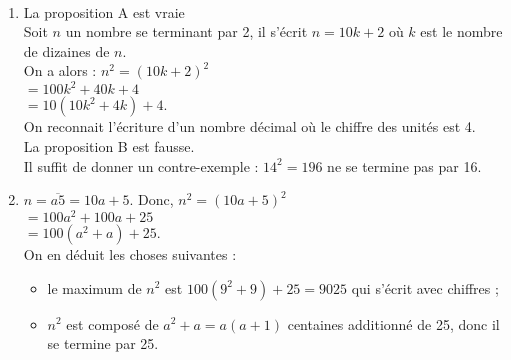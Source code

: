 \ \\ [-5mm]
   \begin{enumerate}
      \item
      {\blue La proposition A est vraie} \\
         Soit $n$ un nombre se terminant par 2, il s'écrit $n=10k+2$ où $k$ est le nombre de dizaines de $n$. \\
         On a alors : $n^2 =(10k+2)^2$ \\
         \hspace*{2.1cm} $=100k^2+40k+4$ \\
         \hspace*{2.1cm} $=10(10k^2+4k)+4$. \\
         On reconnait l'écriture d'un nombre décimal où le chiffre des unités est 4. \\
      {\blue La proposition B est fausse.} \\
       Il suffit de donner un contre-exemple : $14^2=196$ ne se termine pas par 16. \\
      \item $n =\overline{a5} =10a+5$. Donc, $n^2=(10a+5)^2$ \\
      \hspace*{4.35cm} $=100a^2+100a+25$ \\
      \hspace*{4.35cm} $ =100(a^2+a)+25$. \\
      On en déduit les choses suivantes :
      \begin{itemize}
         \item le maximum de $n^2$ est $100(9^2+9)+25 =9025$ qui s'écrit avec { chiffres} ; \\
         \item $n^2$ est composé de $a^2+a =${\blue $a(a+1)$} centaines additionné de 25, donc {\blue il se termine par 25}. \\
      \end{itemize}
   \end{enumerate}
